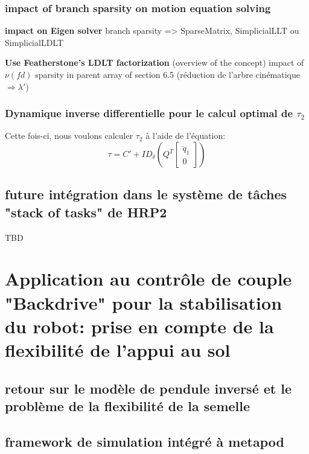 \documentclass{report}
\begin{document}
\subsection{impact of branch sparsity on motion equation solving}
\textbf{impact on Eigen solver}
branch sparsity => SparseMatrix, SimplicialLLT ou SimplicialLDLT

\textbf{Use Featherstone's LDLT factorization}  (overview of the concept)
impact of $\nu(fd)$ sparsity in parent array of section 6.5 (réduction de l'arbre cinématique $\Rightarrow \lambda'$)

\subsection{Dynamique inverse differentielle pour le calcul optimal de $\tau_2$}

Cette fois-ci, nous voulons calculer $\tau_2$ à l'aide  de l'équation:
\begin{equation}
\tau = C' + ID_{\delta} \left( Q^T \begin{bmatrix} 
                                                       \ddot{q}_1 \\
                                                       0 
                                                   \end{bmatrix} \right)
\end{equation}

\section{future intégration dans le système de tâches "stack of tasks" de HRP2}

TBD

\chapter{Application au contrôle de couple "Backdrive" pour la stabilisation du robot: prise en compte de la flexibilité de l'appui au sol}

\section{retour sur le modèle de pendule inversé et le problème de la flexibilité de la semelle}

\section{framework de simulation intégré à metapod}
\end{document}
